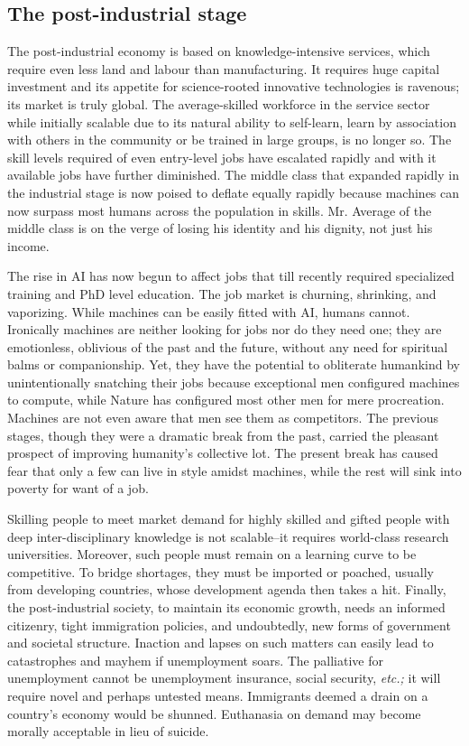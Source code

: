 \begin{multicols}{2}
\subsection{The post-industrial stage}

The post-industrial economy is based on knowledge-intensive services, which require even less land and labour than manufacturing. It requires huge capital investment and its appetite for science-rooted innovative technologies is ravenous; its market is truly global. The average-skilled workforce in the service sector while initially scalable due to its natural ability to self-learn, learn by association with others in the community or be trained in large groups, is no longer so. The skill levels required of even entry-level jobs have escalated rapidly and with it available jobs have further diminished. The middle class that expanded rapidly in the industrial stage is now poised to deflate equally rapidly because machines can now surpass most humans across the population in skills. Mr. Average of the middle class is on the verge of losing his identity and his dignity, not just his income.

The rise in AI has now begun to affect jobs that till recently required specialized training and PhD level education. The job market is churning, shrinking, and vaporizing. While machines can be easily fitted with AI, humans cannot. Ironically machines are neither looking for jobs nor do they need one; they are emotionless, oblivious of the past and the future, without any need for spiritual balms or companionship. Yet, they have the potential to obliterate humankind by unintentionally snatching their jobs because exceptional men configured machines to compute, while Nature has configured most other men for mere procreation. Machines are not even aware that men see them as competitors. The previous stages, though they were a dramatic break from the past, carried the pleasant prospect of improving humanity's collective lot. The present break has caused fear that only a few can live in style amidst machines, while the rest will sink into poverty for want of a job. 

Skilling people to meet market demand for highly skilled and gifted people with deep inter-disciplinary knowledge is not scalable--it requires world-class research universities. Moreover, such people must remain on a learning curve to be competitive. To bridge shortages, they must be imported or poached, usually from developing countries, whose development agenda then takes a hit. Finally, the post-industrial society, to maintain its economic growth, needs an informed citizenry, tight immigration policies, and undoubtedly, new forms of government and societal structure. Inaction and lapses on such matters can easily lead to catastrophes and mayhem if unemployment soars. The palliative for unemployment cannot be unemployment insurance, social security, \textit{etc.;} it will require novel and perhaps untested means. Immigrants deemed a drain on a country's economy would be shunned. Euthanasia on demand may become morally acceptable in lieu of suicide.


\end{multicols}
